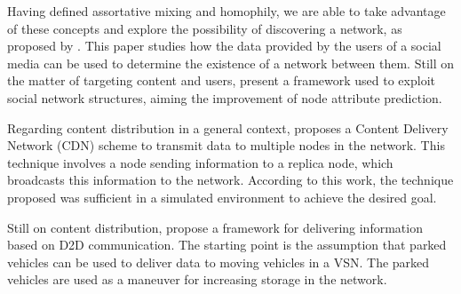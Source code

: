 \documentclass[12pt]{article}
\begin{document}
Having defined assortative mixing and homophily, we are able to take advantage of these concepts and explore the possibility of discovering a network, as proposed by \cite{twitter_graph}. This paper studies how the data provided by the users of a social media can be used to determine the existence of a network between them. Still on the matter of targeting content and users, \cite{mulders} present a framework used to exploit social network structures, aiming the improvement of node attribute prediction.

Regarding content distribution in a general context, \cite{Khaitiyakun:2014:ADD:2684793.2684799} proposes a Content Delivery Network (CDN) scheme to transmit data to multiple nodes in the network. This technique involves a node sending information to a replica node, which broadcasts this information to the network. According to this work, the technique proposed was sufficient in a simulated environment to achieve the desired goal.

Still on content distribution, \cite{d2d} propose a framework for delivering information based on D2D communication. The starting point is the assumption that parked vehicles can be used to deliver data to moving vehicles in a VSN. The parked vehicles are used as a maneuver for increasing storage in the network.








\end{document}
